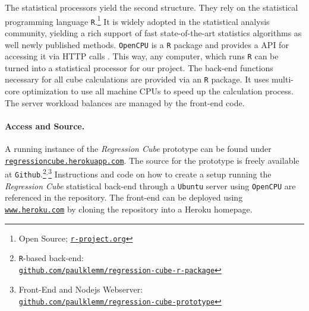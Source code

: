 \documentclass[journal]{style/vgtc} 			          %
\newcommand{\com}[1]{\textcolor{orange}{\uline{#1}}}
\begin{document}
The statistical processors yield the second structure.
They rely on the statistical programming language \texttt{R}.\footnote{Open Source; \href{http://r-project.org}{\texttt{r-project.org}}}
It is widely adopted in the statistical analysis community, yielding a rich support of fast state-of-the-art statistics algorithms as well newly published methods.
\texttt{OpenCPU} is a \texttt{R} package and provides a API for accessing it via HTTP calls \cite{Ooms}.
This way, any computer, which runs \texttt{R} can be turned into a statistical processor for our project.
The back-end functions necessary for all cube calculations are provided via an \texttt{R} package.
It uses multi-core optimization to use all machine CPUs to speed up the calculation process.
The server workload balances are managed by the front-end code.

\paragraph{Access and Source.}
A running instance of the \emph{Regression Cube} prototype can be found under \href{http://regressioncube.herokuapp.com/}{\texttt{regressioncube.herokuapp.com}}.
The source for the prototype is freely available at \texttt{Github}.\footnote{\texttt{R}-based back-end: \href{https://github.com/paulklemm/regression-cube-r-package}{\\\texttt{github.com/paulklemm/regression-cube-r-package}}}$^{,}$\footnote{Front-End and Nodejs Webserver: \href{https://github.com/paulklemm/regression-cube-prototype}{\texttt{\\github.com/paulklemm/regression-cube-prototype}}}
Instructions and code on how to create a setup running the \emph{Regression Cube} statistical back-end through a \texttt{Ubuntu} server using \texttt{OpenCPU} are referenced in the repository.
The front-end can be deployed using \href{https://www.heroku.com/}{\texttt{www.heroku.com}} by cloning the repository into a Heroku homepage. 
\end{document}
